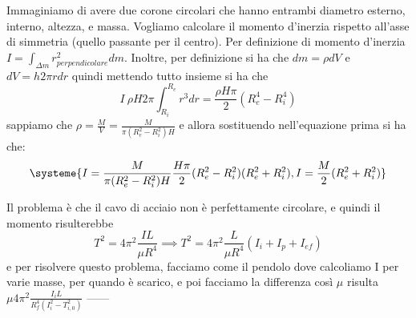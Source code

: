 \documentclass[a4paper]{article}
\begin{document}
Immaginiamo di avere due corone circolari che hanno entrambi diametro esterno, interno, altezza, e massa. Vogliamo calcolare il momento d'inerzia rispetto all'asse di simmetria (quello passante per il centro). Per definizione di momento d'inerzia $I = \int_{\Delta m} r^2_{perpendicolare} dm$. Inoltre, per definizione si ha che $dm = \rho dV$ e $dV = h 2\pi r dr$ quindi mettendo tutto insieme si ha che 
\begin{equation}
    I \ \rho H 2 \pi \int_{R_i}^{R_e} r^3 dr = \frac{\rho H \pi}{2} (R^4_e - R^4_i)
\end{equation}
sappiamo che $\rho = \frac{M}{V} = \frac{M}{\pi (R^2_e - R^2_i)H}$ e allora sostituendo nell'equazione prima si ha che:
\begin{equation*}
    \systeme{
    I = \frac{M}{\pi (R^2_e - R^2_i)H}  \frac{H\pi}{2} (R_e^2-R^2_i)(R_e^2+R^2_i),
    I = \frac{M}{2} (R_e^2+R^2_i)
}
\end{equation*}

Il problema è che il cavo di acciaio non è perfettamente circolare, e quindi il momento risulterebbe
\begin{equation}
    T^2 = 4\pi^2 \frac{IL}{\mu R^4} \implies T^2 = 4\pi^2 \frac{L}{\mu R^4} (I_i + I_p + I_{ef})
\end{equation}
e per risolvere questo problema, facciamo come il pendolo dove calcoliamo I per varie masse, per quando è scarico, e poi facciamo la differenza così $\mu$ risulta $\mu 4\pi^2 \frac{I_i L}{R^4_f (I^2_i - T^2_{i,0})}$ ------
\end{document}
